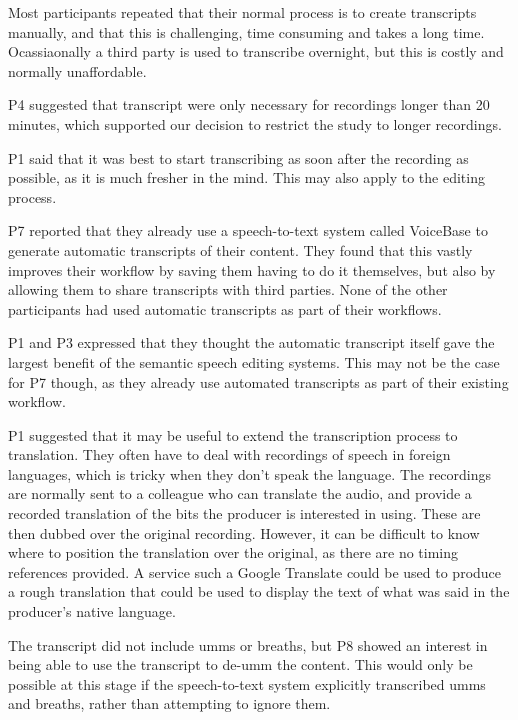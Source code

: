 Most participants repeated that their normal process is to create transcripts manually, and that this is challenging,
time consuming and takes a long time. Ocassiaonally a third party is used to transcribe overnight, but this is costly
and normally unaffordable.

P4 suggested that transcript were only necessary for recordings longer than 20 minutes, which supported our decision to
restrict the study to longer recordings.

P1 said that it was best to start transcribing as soon after the recording as possible, as it is much fresher in the
mind. This may also apply to the editing process.


P7 reported that they already use a speech-to-text system called VoiceBase to generate automatic transcripts of their
content. They found that this vastly improves their workflow by saving them having to do it themselves, but also by
allowing them to share transcripts with third parties. None of the other participants had used automatic transcripts as
part of their workflows.


P1 and P3 expressed that they thought the automatic transcript itself gave the largest benefit of the semantic speech
editing systems. This may not be the case for P7 though, as they already use automated transcripts as part of their
existing workflow.


P1 suggested that it may be useful to extend the transcription process to translation. They often have to deal with
recordings of speech in foreign languages, which is tricky when they don't speak the language. The recordings are
normally sent to a colleague who can translate the audio, and provide a recorded translation of the bits the producer
is interested in using. These are then dubbed over the original recording. However, it can be difficult to know where
to position the translation over the original, as there are no timing references provided. A service such a Google
Translate could be used to produce a rough translation that could be used to display the text of what was said in the
producer's native language.


The transcript did not include umms or breaths, but P8 showed an interest in being able to use the transcript to de-umm
the content. This would only be possible at this stage if the speech-to-text system explicitly transcribed umms and
breaths, rather than attempting to ignore them.


